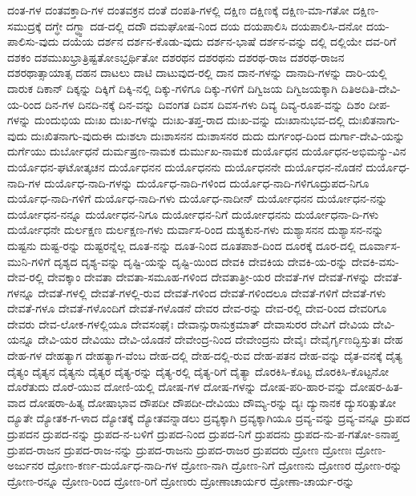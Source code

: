 ದಂತ-ಗಳ
ದಂತವಕ್ತಾದಿ-ಗಳ
ದಂತವಕ್ರನ
ದಂತೆ
ದಂಪತಿ-ಗಳಲ್ಲಿ
ದಕ್ಷಿಣ
ದಕ್ಷಿಣಕ್ಕೆ
ದಕ್ಷಿಣ-ಮಾ-ಗತೋ
ದಕ್ಷಿಣ-ಸಮುದ್ರಕ್ಕೆ
ದಗ್ಧೇ
ದಗ್ಧ್ವಾ
ದಡ-ದಲ್ಲಿ
ದದೌ
ದಮಘೋಷ-ನಿಂದ
ದಯ
ದಯಪಾಲಿಸಿ
ದಯಪಾಲಿಸಿ-ದನೋ
ದಯ-ಪಾಲಿಸು-ವುದು
ದಯೆಯ
ದರ್ಶನ
ದರ್ಶನ-ಕೊಡು-ವುದು
ದರ್ಶನ-ಭಾಷೆ
ದರ್ಶನ-ವನ್ನು
ದಲ್ಲಿ
ದಲ್ಲಿಯೇ
ದವ-ರಿಗೆ
ದಶಕಂ
ದಶಮುಖಭ್ರಾತ್ರಿಷ್ಟತೋಽಭ್ತರ್ಥಿತೋ
ದಶರಥನ
ದಶರಥನು
ದಶರಥ-ರಾಜ
ದಶರಥ-ರಾಜನ
ದಶರಥಾತ್ಸಾಯಾತ್ಸ
ದಹನ
ದಾಟಲು
ದಾಟಿ
ದಾಟುವುದ-ರಲ್ಲಿ
ದಾನ
ದಾನ-ಗಳನ್ನು
ದಾನಾದಿ-ಗಳನ್ನು
ದಾರಿ-ಯಲ್ಲಿ
ದಾರುಕ
ದಿಕಾನ್
ದಿಕ್ಕನ್ನು
ದಿಕ್ಕಿಗೆ
ದಿಕ್ಕಿ-ನಲ್ಲಿ
ದಿಕ್ಕು-ಗಳಿಗೂ
ದಿಕ್ಕು-ಗಳಿಗೆ
ದಿಗ್ವಿಜಯ
ದಿಗ್ವಿಜಯಕ್ಕಾಗಿ
ದಿತಿಅದಿತಿ-ದೇವಿ-ಯ-ರಿಂದ
ದಿನ-ಗಳ
ದಿನದಿ-ನಕ್ಕೆ
ದಿನ-ವನ್ನು
ದಿವಂಗತ
ದಿವಸ
ದಿವಸ-ಗಳು
ದಿವ್ಯ
ದಿವ್ಯ-ರೂಪ-ವನ್ನು
ದಿಶಂ
ದೀಪ-ಗಳನ್ನು
ದುಂದುಭಿಯ
ದುಃಖ
ದುಃಖ-ಗಳನ್ನು
ದುಃಖ-ತಪ್ತ-ರಾದ
ದುಃಖ-ವನ್ನು
ದುಃಖಾನುಭವ-ದಲ್ಲಿ
ದುಃಖಿತನಾಗು-ವುದು
ದುಃಖಿತನಾಗು-ವುದುಈ
ದುಃಶಲಾ
ದುಃಶಾಸನನ
ದುಃಶಾಸನರ
ದುದು
ದುರ್ಗಂಧ-ದಿಂದ
ದುರ್ಗಾ-ದೇವಿ-ಯನ್ನು
ದುರ್ಗೆಯು
ದುರ್ಬೋಧನೆ
ದುರ್ಮಷ್ರಣ-ನಾಮಕ
ದುರ್ಮುಖ-ನಾಮಕ
ದುರ್ಯೊಧನ
ದುರ್ಯೊಧನ-ಅಭಿಮನ್ಯು-ವಿನ
ದುರ್ಯೊಧನ-ಘಟೋತ್ಕಚನ
ದುರ್ಯೊಧನನ
ದುರ್ಯೊಧನನು
ದುರ್ಯೊಧನನೇ
ದುರ್ಯೊಧನ-ನೊಡನೆ
ದುರ್ಯೊಧ-ನಾದಿ-ಗಳ
ದುರ್ಯೊಧ-ನಾದಿ-ಗಳನ್ನು
ದುರ್ಯೊಧ-ನಾದಿ-ಗಳಿಂದ
ದುರ್ಯೊಧ-ನಾದಿ-ಗಳಿಗೂದ್ರುಪದ-ನಿಗೂ
ದುರ್ಯೊಧ-ನಾದಿ-ಗಳಿಗೆ
ದುರ್ಯೊಧ-ನಾದಿ-ಗಳು
ದುರ್ಯೊಧ-ನಾದೀನ್
ದುರ್ಯೋಧನನ
ದುರ್ಯೋಧನ-ನನ್ನು
ದುರ್ಯೋಧನ-ನನ್ನೂ
ದುರ್ಯೋಧನ-ನಿಗೂ
ದುರ್ಯೋಧನ-ನಿಗೆ
ದುರ್ಯೋಧನನು
ದುರ್ಯೋಧನಾ-ದಿ-ಗಳು
ದುರ್ಯೋಧನೇ
ದುರ್ಲಕ್ಷಣ
ದುರ್ಲಕ್ಷಣ-ಗಳು
ದುರ್ವಾಸ-ರಿಂದ
ದುಶ್ಯಕುನ-ಗಳು
ದುಶ್ಯಾಸನನ
ದುಶ್ಯಾಸನ-ನನ್ನು
ದುಷ್ಟನು
ದುಷ್ಟ-ರನ್ನು
ದುಷ್ಟರನ್ನೆಲ್ಲ
ದೂತ-ನನ್ನು
ದೂತ-ನಿಂದ
ದೂತಪಾಶ-ದಿಂದ
ದೂರಕ್ಕೆ
ದೂರ-ದಲ್ಲಿ
ದೂರ್ವಾಸ-ಮುನಿ-ಗಳಿಗೆ
ದೃಶ್ಯದ
ದೃಶ್ಯ-ವನ್ನು
ದೃಷ್ಟಿ-ಯನ್ನು
ದೃಷ್ಟಿ-ಯಿಂದ
ದೇವಕಿ
ದೇವಕಿಯ
ದೇವಕಿ-ಯ-ರನ್ನು
ದೇವಕಿ-ವಸು-ದೇವ-ರಲ್ಲಿ
ದೇವಕ್ಕಾಂ
ದೇವತಾ
ದೇವತಾ-ಸಮೂಹ-ಗಳಿಂದ
ದೇವತಾತ್ರೀ-ಯರ
ದೇವತೆ-ಗಳ
ದೇವತೆ-ಗಳನ್ನು
ದೇವತೆ-ಗಳನ್ನೂ
ದೇವತೆ-ಗಳಲ್ಲಿ
ದೇವತೆ-ಗಳಲ್ಲಿ-ರುವ
ದೇವತೆ-ಗಳಿಂದ
ದೇವತೆ-ಗಳಿಂದಲೂ
ದೇವತೆ-ಗಳಿಗೆ
ದೇವತೆ-ಗಳು
ದೇವತೆ-ಗಳೂ
ದೇವತೆ-ಗಳೊಂದಿಗೆ
ದೇವತೆ-ಗಳೊಡನೆ
ದೇವರ
ದೇವ-ರನ್ನು
ದೇವ-ರಲ್ಲಿ
ದೇವ-ರಿಂದ
ದೇವರಿಗೂ
ದೇವರು
ದೇವ-ಲೋಕ-ಗಳಲ್ಲಿಯೂ
ದೇವಸಂಘೈಃ
ದೇವಾನ್ಸುರಾನುಕ್ರಮಾತ್
ದೇವಾಸುರರ
ದೇವಿಗೆ
ದೇವಿಯ
ದೇವಿ-ಯನ್ನೂ
ದೇವಿ-ಯರ
ದೇವಿಯು
ದೇವಿ-ಯೊಡನೆ
ದೇವೇಂದ್ರ-ನಿಂದ
ದೇವೇಂದ್ರನು
ದೇವೈಃ
ದೇವೈರ್ಗೃಣದ್ಭಿಸ್ತುತಃ
ದೇಹ
ದೇಹ-ಗಳ
ದೇಹತ್ಯಾಗ
ದೇಹತ್ಯಾಗ-ವೆಂಬ
ದೇಹ-ದಲ್ಲಿ
ದೇಹ-ದಲ್ಲಿ-ರುವ
ದೇಹ-ಪತನ
ದೇಹ-ವನ್ನು
ದೈತ-ವನಕ್ಕೆ
ದೈತ್ಯ
ದೈತ್ಯಂ
ದೈತ್ಯನ
ದೈತ್ಯನು
ದೈತ್ಯರ
ದೈತ್ಯ-ರನ್ನು
ದೈತ್ಯ-ರಲ್ಲಿ
ದೈತ್ಯ-ರಿಗೆ
ದೈತ್ಯಾ
ದೊರಕಿಸಿ-ಕೊಟ್ಟ
ದೊರಕಿಸಿ-ಕೊಟ್ಟನೋ
ದೊರೆತುದು
ದೊರೆ-ಯುವ
ದೋಣಿ-ಯಲ್ಲಿ
ದೋಷ-ಗಳ
ದೋಷ-ಗಳನ್ನು
ದೋಷ-ಪರಿ-ಹಾರ-ವನ್ನು
ದೋಷರ-ಹಿತ-ವಾದ
ದೋಷರಾ-ಹಿತ್ಯ
ದೋಷಾಭಾವ
ದೌಪದೀ
ದೌಪದೀ-ದೇವಿಯು
ದೌಮ್ಯ-ರನ್ನು
ದ್ಯಃ
ದ್ಯುನಾನಕ
ದ್ಯುಸರಿತ್ಸುತೋ
ದ್ಯೂತೇ
ದ್ಯೋತಕ-ಗ-ಳಾದ
ದ್ಯೋತಕ್ಕೆ
ದ್ಯೋತವನ್ನಾಡಲು
ದ್ರವ್ಯಕ್ಕಾಗಿ
ದ್ರವ್ಯಕ್ಕಾಗಿಯೂ
ದ್ರವ್ಯ-ವನ್ನು
ದ್ರವ್ಯ-ವನ್ನೂ
ದ್ರುಪದ
ದ್ರುಪದನ
ದ್ರುಪದ-ನನ್ನು
ದ್ರುಪದ-ನ-ಬಳಿಗೆ
ದ್ರುಪದ-ನಿಂದ
ದ್ರುಪದ-ನಿಗೆ
ದ್ರುಪದನು
ದ್ರುಪದ-ನು-ಪ-ಗತೋ-ಽನಾಪ್ತ
ದ್ರುಪದ-ರಾಜನ
ದ್ರುಪದ-ರಾಜ-ನನ್ನು
ದ್ರುಪದ-ರಾಜನು
ದ್ರುಪದ-ರಾಜರ
ದ್ರುಪದರು
ದ್ರೋಣ
ದ್ರೋಣಃ
ದ್ರೋಣ-ಅರ್ಜುನರ
ದ್ರೋಣ-ಕರ್ಣ-ದುರ್ಯೊಧ-ನಾದಿ-ಗಳ
ದ್ರೋಣ-ನಾಗಿ
ದ್ರೋಣ-ನಿಗೆ
ದ್ರೋಣನು
ದ್ರೋಣರ
ದ್ರೋಣ-ರನ್ನು
ದ್ರೋಣ-ರನ್ನೂ
ದ್ರೋಣ-ರಿಂದ
ದ್ರೋಣ-ರಿಗೆ
ದ್ರೋಣರು
ದ್ರೋಣಾಚಾರ್ಯರ
ದ್ರೋಣಾ-ಚಾರ್ಯ-ರನ್ನು
